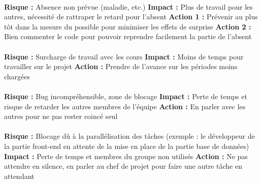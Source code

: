 \paragraph{}

\noindent \textbf{Risque : } Absence non prévue (maladie, etc.)
\newline
\textbf{Impact : } Plus de travail pour les autres, nécessité de rattraper le retard pour l'absent
\newline
\textbf{Action 1 : } Prévenir au plus tôt dans la mesure du possible pour minimiser les effets de surprise
\newline
\textbf{Action 2 : } Bien commenter le code pour pouvoir reprendre facilement la partie de l’absent

\paragraph{}

\noindent \textbf{Risque : } Surcharge de travail avec les cours
\newline
\textbf{Impact : } Moins de temps pour travailler sur le projet
\newline
\textbf{Action : } Prendre de l’avance sur les périodes moins chargées

\paragraph{}

\noindent \textbf{Risque : } Bug incompréhensible, zone de blocage
\newline
\textbf{Impact : } Perte de temps et risque de retarder les autres membres de l’équipe
\newline
\textbf{Action : } En parler avec les autres pour ne pas rester coincé seul

\paragraph{}
 
\noindent \textbf{Risque : } Blocage dû à la parallélisation des tâches (exemple : le développeur de la partie
front-end en attente de la mise en place de la partie base de données)
\newline
\textbf{Impact : } Perte de temps et membres du groupe non utilisés
\newline
\textbf{Action : } Ne pas attendre en silence, en parler au chef de projet pour faire une autre tâche
en attendant

